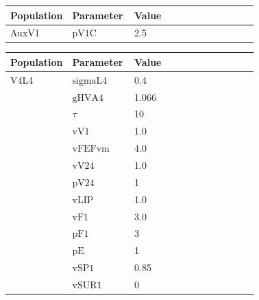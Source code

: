 \documentclass{article}
\begin{document}
\vspace{2ex}

\noindent
\begin{tabularx}{\linewidth}{|p{0.25\linewidth}|p{0.25\linewidth}|X|}\hline
\textbf{Population} & \textbf{Parameter} & \textbf{Value}   \\ \hline

    AuxV1             & ${\text{pV1C}}$        & 2.5  \\ \hline

\end{tabularx}

\vspace{2ex}

\noindent
\begin{tabularx}{\linewidth}{|p{0.25\linewidth}|p{0.25\linewidth}|X|}\hline
\textbf{Population} & \textbf{Parameter} & \textbf{Value}   \\ \hline

    V4L4             & ${\text{sigmaL4}}$        & 0.4  \\ \hline

                 & ${\text{gHVA4}}$        & 1.066  \\ \hline

                 & $\tau$        & 10  \\ \hline

                 & ${\text{vV1}}$        & 1.0  \\ \hline

                 & ${\text{vFEFvm}}$        & 4.0  \\ \hline

                 & ${\text{vV24}}$        & 1.0  \\ \hline

                 & ${\text{pV24}}$        & 1  \\ \hline

                 & ${\text{vLIP}}$        & 1.0  \\ \hline

                 & ${\text{vF1}}$        & 3.0  \\ \hline

                 & ${\text{pF1}}$        & 3  \\ \hline

                 & ${\text{pE}}$        & 1  \\ \hline

                 & ${\text{vSP1}}$        & 0.85  \\ \hline

                 & ${\text{vSUR1}}$        & 0  \\ \hline

\end{tabularx}
\end{document}
